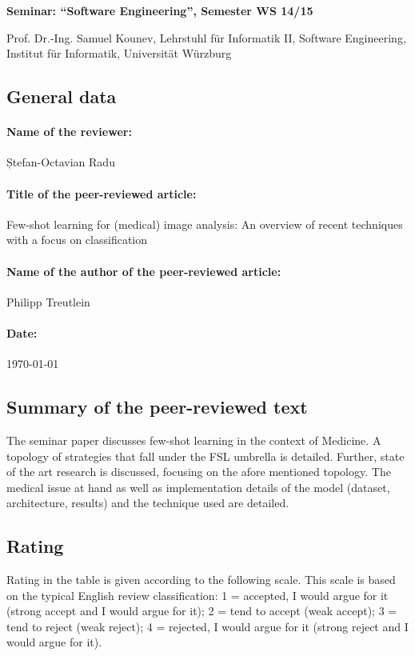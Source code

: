 \documentclass[12pt]{scrartcl}
\begin{document}
\begin{center}
\textbf{Seminar: "`Software Engineering"', Semester WS 14/15}

Prof. Dr.-Ing. Samuel Kounev, Lehrstuhl für Informatik II, Software Engineering, Institut für Informatik, Universität Würzburg
\end{center}



\subsection*{General data}

\paragraph{Name of the reviewer:} Ștefan-Octavian Radu

\paragraph{Title of the peer-reviewed article:} Few-shot learning for (medical)
image analysis: An overview of recent techniques with a focus on classification


\paragraph{Name of the author of the peer-reviewed article:} Philipp Treutlein

\paragraph{Date:} \today


\subsection*{Summary of the peer-reviewed text}

The seminar paper discusses few-shot learning in the context of Medicine. A 
topology of strategies that fall under the FSL umbrella is detailed. Further, 
state of the art research is discussed, focusing on the afore mentioned topology. 
The medical issue at hand as well as implementation details of the model (dataset, architecture, results) and the technique used are detailed.

\subsection*{Rating}
Rating in the table is given according to the following scale. This scale is based on the typical English review classification: 1 = accepted, I would argue for it (strong accept and I would argue for it); 2 = tend to accept (weak accept); 3 = tend to reject (weak reject); 4 = rejected, I would argue for it (strong reject and I would argue for it).
\end{document}
